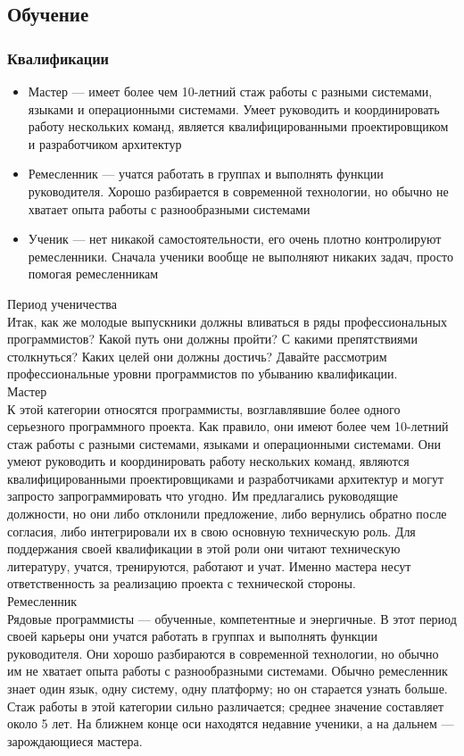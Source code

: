\documentclass{../industrial-development}
\begin{document}
\subsection{Обучение}
\begin{frame} \frametitle{Квалификации}
\begin{itemize}
  \item Мастер --- имеет более чем 10-летний стаж работы с разными системами, языками и операционными системами. Умеет руководить и координировать работу нескольких команд, является квалифицированными проектировщиком и разработчиком архитектур
  \item Ремесленник --- учатся работать в группах и выполнять функции руководителя. Хорошо разбирается в современной технологии, но обычно не хватает опыта работы с разнообразными системами
	\item Ученик --- нет никакой самостоятельности, его очень плотно контролируют ремесленники. Сначала ученики вообще не выполняют никаких задач, просто помогая ремесленникам
\end{itemize}
\end{frame}
\lecturenotes
Период ученичества\\
Итак, как же молодые выпускники должны вливаться в ряды профессиональных программистов? Какой путь они должны пройти? С какими препятствиями столкнуться? Каких целей они должны достичь? Давайте рассмотрим профессиональные уровни программистов по убыванию квалификации.\\
Мастер\\
К этой категории относятся программисты, возглавлявшие более одного серьезного программного проекта. Как правило, они имеют более чем 10-летний стаж работы с разными системами, языками и операционными системами. Они умеют руководить и координировать работу нескольких команд, являются квалифицированными проектировщиками и разработчиками архитектур и могут запросто запрограммировать что угодно. Им предлагались руководящие должности, но они либо отклонили предложение, либо вернулись обратно после согласия, либо интегрировали их в свою основную техническую роль. Для поддержания своей квалификации в этой роли они читают техническую литературу, учатся, тренируются, работают и учат. Именно мастера несут ответственность за реализацию проекта с технической стороны.\\
Ремесленник\\
Рядовые программисты — обученные, компетентные и энергичные. В этот период своей карьеры они учатся работать в группах и выполнять функции руководителя. Они хорошо разбираются в современной технологии, но обычно им не хватает опыта работы с разнообразными системами. Обычно ремесленник знает один язык, одну систему, одну платформу; но он старается узнать больше. Стаж работы в этой категории сильно различается; среднее значение составляет около 5 лет. На ближнем конце оси находятся недавние ученики, а на дальнем — зарождающиеся мастера.\\
\end{document}
